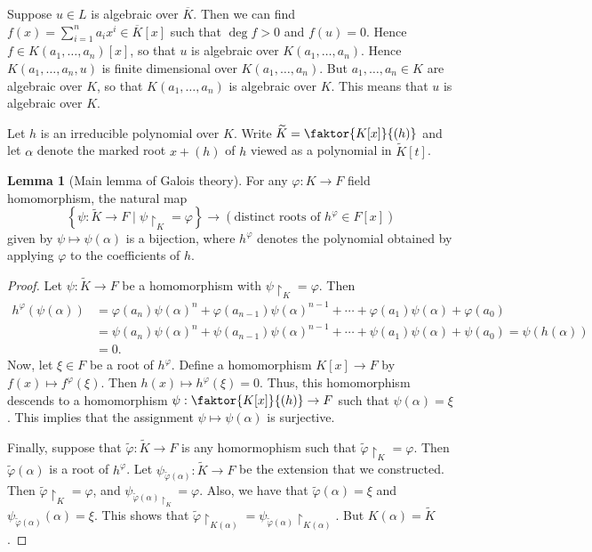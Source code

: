 \documentclass[10pt,letterpaper,cm]{nupset}
\theoremstyle{definition}
\theoremstyle{theorem}
\newtheorem{lemma}[definition]{Lemma}
\theoremstyle{remark}
\newcommand{\1}{\mathbf{1}}
\newcommand{\0}{\vec 0}
\begin{document}
\smallskip

Suppose $u\in L$ is algebraic over $\overline{K}$. Then we can find $f(x) = \sum_{i=1}^n a_ix^i \in \overline{K}[x]$ such that $\deg{f} >0$ and $f(u) =0$. Hence $f\in K(a_1, \ldots, a_n)[x]$, so that $u$ is algebraic over $K(a_1, \ldots, a_n)$. Hence $K(a_1, \ldots, a_n, u)$ is finite dimensional over $K(a_1, \ldots, a_n)$. But $a_1, \ldots, a_n \in K$ are algebraic over $K$, so that $K(a_1, \ldots, a_n)$ is algebraic over $K$.  This means that $u$ is algebraic over $K$.

Let $h$ is an irreducible polynomial over $K$. Write $\widetilde{K} = \faktor{K[x]}{(h)}$ and let $\alpha$ denote the marked root $x+(h)$ of $h$ viewed as a polynomial in $\widetilde{K}[t]$.


\begin{lemma}[Main lemma of Galois theory]\label{mlGT}
For any $\varphi : K \to F$ field homomorphism, the natural map $$\left\{\psi : \widetilde{K} \to F \mid \psi \restriction_K = \varphi \right\} \to \left(\text{distinct roots of } h^{\varphi} \in F[x]\right)$$ given by $ \psi \mapsto \psi(\alpha)$ is a bijection, where $h^{\varphi}$ denotes the polynomial obtained by applying $\varphi$ to the coefficients of $h$. 
\end{lemma}
\begin{proof}
Let $\psi : \widetilde{K} \to F$ be a homomorphism with $\psi \restriction_K = \varphi$. Then 
\begin{align*}
h^{\varphi}(\psi(\alpha)) & = \varphi(a_n)\psi(\alpha)^n + \varphi(a_{n-1})\psi(\alpha)^{n-1} + \cdots + \varphi(a_1) \psi(\alpha) + \varphi(a_0) 
\\ & = \psi(a_n)\psi(\alpha)^n + \psi(a_{n-1})\psi(\alpha)^{n-1} + \cdots + \psi(a_1)\psi(\alpha) + \psi(a_0) = \psi(h(\alpha)) 
\\ &= 0.
\end{align*}  Now, let $\xi \in F$ be a root of $h^{\varphi}$. Define a homomorphism $K[x] \to F$ by $f(x) \mapsto f^{\varphi}(\xi)$. Then $h(x) \mapsto h^{\varphi}(\xi)=0$. Thus, this homomorphism descends to a homomorphism $\psi : \faktor{K[x]}{(h)} \to F$ such that $\psi(\alpha) = \xi$. This implies that the assignment $\psi \mapsto \psi(\alpha)$ is surjective.

\medskip


Finally, suppose that $\tilde{\varphi} : \widetilde{K} \to F$ is any homormophism such that $\tilde{\varphi}\restriction_K = \varphi$. Then $\tilde{\varphi}(\alpha)$ is a root of $h^{\varphi}$. Let $\psi_{\tilde{\varphi}(\alpha)} : \widetilde{K} \to F$ be the extension that we constructed. Then $\tilde{\varphi}\restriction_K = \varphi$, and $\psi_{\tilde{\varphi}(\alpha)\restriction_K} = \varphi$. Also, we have that $\tilde{\varphi}(\alpha) = \xi$ and $\psi_{\tilde{\varphi}(\alpha)}(\alpha) = \xi$. This shows that $\tilde{\varphi}\restriction_{K(\alpha)} = \psi_{\tilde{\varphi}(\alpha)} \restriction_{K(\alpha)}$. But $K(\alpha) = \widetilde{K}$.
\end{proof}
\end{document}
